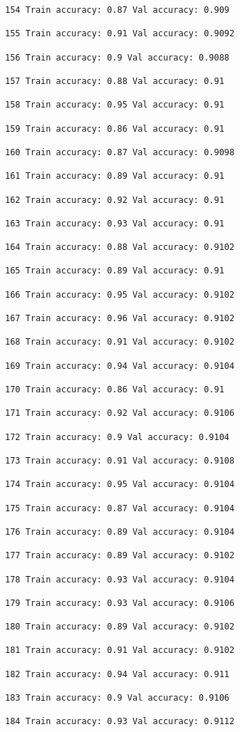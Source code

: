 \documentclass[11pt]{article}
\begin{document}
\begin{Verbatim}[commandchars=\\\{\}]
154 Train accuracy: 0.87 Val accuracy: 0.909

155 Train accuracy: 0.91 Val accuracy: 0.9092

156 Train accuracy: 0.9 Val accuracy: 0.9088

157 Train accuracy: 0.88 Val accuracy: 0.91

158 Train accuracy: 0.95 Val accuracy: 0.91

159 Train accuracy: 0.86 Val accuracy: 0.91

160 Train accuracy: 0.87 Val accuracy: 0.9098

161 Train accuracy: 0.89 Val accuracy: 0.91

162 Train accuracy: 0.92 Val accuracy: 0.91

163 Train accuracy: 0.93 Val accuracy: 0.91

164 Train accuracy: 0.88 Val accuracy: 0.9102

165 Train accuracy: 0.89 Val accuracy: 0.91

166 Train accuracy: 0.95 Val accuracy: 0.9102

167 Train accuracy: 0.96 Val accuracy: 0.9102

168 Train accuracy: 0.91 Val accuracy: 0.9102

169 Train accuracy: 0.94 Val accuracy: 0.9104

170 Train accuracy: 0.86 Val accuracy: 0.91

171 Train accuracy: 0.92 Val accuracy: 0.9106

172 Train accuracy: 0.9 Val accuracy: 0.9104

173 Train accuracy: 0.91 Val accuracy: 0.9108

174 Train accuracy: 0.95 Val accuracy: 0.9104

175 Train accuracy: 0.87 Val accuracy: 0.9104

176 Train accuracy: 0.89 Val accuracy: 0.9104

177 Train accuracy: 0.89 Val accuracy: 0.9102

178 Train accuracy: 0.93 Val accuracy: 0.9104

179 Train accuracy: 0.93 Val accuracy: 0.9106

180 Train accuracy: 0.89 Val accuracy: 0.9102

181 Train accuracy: 0.91 Val accuracy: 0.9102

182 Train accuracy: 0.94 Val accuracy: 0.911

183 Train accuracy: 0.9 Val accuracy: 0.9106

184 Train accuracy: 0.93 Val accuracy: 0.9112


\end{Verbatim}
\end{document}
